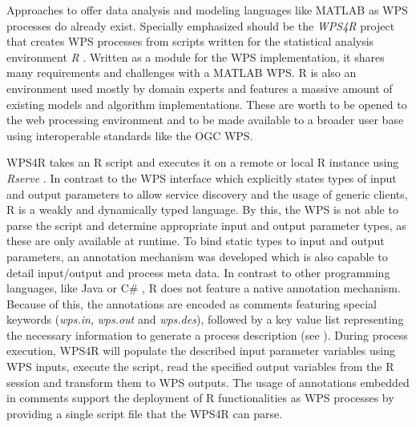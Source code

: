	Approaches to offer data analysis and modeling languages like MATLAB as \ac{WPS} processes do already exist. Specially emphasized should be the \emph{WPS4R} \citep{wps4r} project that creates WPS processes from scripts written for the statistical analysis environment \emph{R} \citep{gnur}. Written as a module for the \ftn \ac{WPS} implementation, it shares many requirements and challenges with a MATLAB WPS. R is also an environment used mostly by domain experts and features a massive amount of existing models and algorithm implementations. These are worth to be opened to the web processing environment and to be made available to a broader user base using interoperable standards like the \ac{OGC} \acl{WPS}.

	

	WPS4R takes an R script and executes it on a remote or local R instance using \emph{Rserve} \citep{rserve}. In contrast to the \ac{WPS} interface which explicitly states types of input and output parameters to allow service discovery and the usage of generic clients, R is a weakly and dynamically typed language. By this, the \ac{WPS} is not able to parse the script and determine appropriate input and output parameter types, as these are only available at runtime. To bind static types to input and output parameters, an annotation mechanism was developed which is also capable to detail input/output and process meta data. In contrast to other programming languages, like Java \citep{jsr175} or C\# \citep{ecma335}, R does not feature a native annotation mechanism. Because of this, the annotations are encoded as comments featuring special keywords (\emph{wps.in}, \emph{wps.out} and \emph{wps.des}), followed by a key value list representing the necessary information to generate a process description (see ). During process execution, WPS4R will populate the described input parameter variables using \ac{WPS} inputs, execute the script, read the specified output variables from the R session and transform them to WPS outputs. The usage of annotations embedded in comments support the deployment of R functionalities as WPS processes by providing a single script file that the WPS4R can parse.

